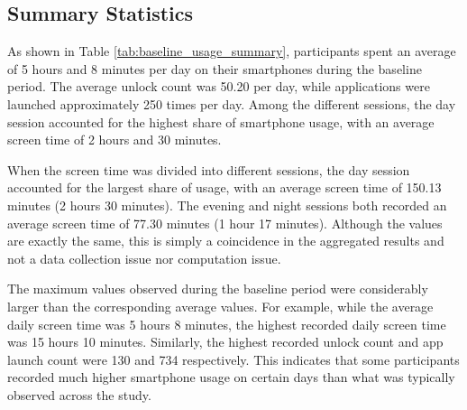 \documentclass[11pt]{report}
\begin{document}
\subsection{Summary Statistics}


\begin{table}[H]
\centering
\small
\caption{Summary of Baseline Smartphone Usage}
\label{tab:baseline_usage_summary}

\end{table}

As shown in Table \ref{tab:baseline_usage_summary}, participants spent an average of 5 hours and 8 minutes 
per day on their smartphones during the baseline period. The average unlock count was 
50.20 per day, while applications were launched approximately 250 times per day. 
Among the different sessions, the day session accounted for the highest share of 
smartphone usage, with an average screen time of 2 hours and 30 minutes.

When the screen time was divided into different sessions, the day session accounted 
for the largest share of usage, with an average screen time of 150.13 minutes 
(2 hours 30 minutes). The evening and night sessions both recorded an average 
screen time of 77.30 minutes (1 hour 17 minutes). Although the values are exactly 
the same, this is simply a coincidence in the aggregated results and not a data 
collection issue nor computation issue.

The maximum values observed during the baseline period were considerably larger than 
the corresponding average values. For example, while the average daily screen time 
was 5 hours 8 minutes, the highest recorded daily screen time was 15 hours 10 minutes. 
Similarly, the highest recorded unlock count and app launch count were 130 and 734 
respectively. This indicates that some participants recorded much higher smartphone 
usage on certain days than what was typically observed across the study.
\end{document}
